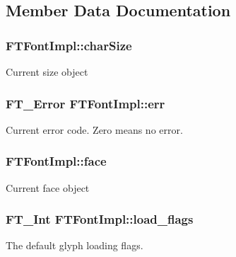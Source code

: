 \subsection{Member Data Documentation}
\subsubsection[{\texorpdfstring{char\+Size}{charSize}}]{ F\+T\+Font\+Impl\+::char\+Size\hspace{0.3cm}{\ttfamily [protected]}}\hypertarget{class_f_t_font_impl_a9ec32ea40b0d1ea53442daec1bbaade1}{}\label{class_f_t_font_impl_a9ec32ea40b0d1ea53442daec1bbaade1}
Current size object 
\subsubsection[{\texorpdfstring{err}{err}}]{\setlength{\rightskip}{0pt plus 5cm}F\+T\+\_\+\+Error F\+T\+Font\+Impl\+::err\hspace{0.3cm}{\ttfamily [protected]}}\hypertarget{class_f_t_font_impl_a39510c5a3665ae65bc7ff9b96c25b0c9}{}\label{class_f_t_font_impl_a39510c5a3665ae65bc7ff9b96c25b0c9}
Current error code. Zero means no error. 
\subsubsection[{\texorpdfstring{face}{face}}]{ F\+T\+Font\+Impl\+::face\hspace{0.3cm}{\ttfamily [protected]}}\hypertarget{class_f_t_font_impl_ab35b9e1966574c6bb88bff520e9c33df}{}\label{class_f_t_font_impl_ab35b9e1966574c6bb88bff520e9c33df}
Current face object 
\subsubsection[{\texorpdfstring{load\+\_\+flags}{load_flags}}]{\setlength{\rightskip}{0pt plus 5cm}F\+T\+\_\+\+Int F\+T\+Font\+Impl\+::load\+\_\+flags\hspace{0.3cm}{\ttfamily [protected]}}\hypertarget{class_f_t_font_impl_a217737b273e6abaa0dd6d837d5677e56}{}\label{class_f_t_font_impl_a217737b273e6abaa0dd6d837d5677e56}
The default glyph loading flags. 

